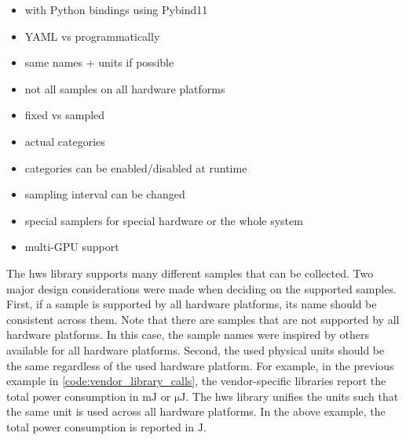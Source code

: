 \begin{itemize}
    \item \cpp with Python bindings using Pybind11 \cite{jakob_pybind11_2024}
    \item YAML vs programmatically
    \item same names + units if possible
    \item not all samples on all hardware platforms
    \item fixed vs sampled
    \item actual categories
    \item categories can be enabled/disabled at runtime
    \item sampling interval can be changed
    \item special samplers for special hardware or the whole system
    \item multi-GPU support
\end{itemize}

The hws library supports many different samples that can be collected. 
Two major design considerations were made when deciding on the supported samples. 
First, if a sample is supported by all hardware platforms, its name should be consistent across them. 
Note that there are samples that are not supported by all hardware platforms. 
In this case, the sample names were inspired by others available for all hardware platforms. 
Second, the used physical units should be the same regardless of the used hardware platform. 
For example, in the previous example in \autoref{code:vendor_library_calls}, the vendor-specific libraries report the total power consumption in $\si{\milli\joule}$ or $\si{\micro\joule}$. 
The hws library unifies the units such that the same unit is used across all hardware platforms. 
In the above example, the total power consumption is reported in $\si{\joule}$. 